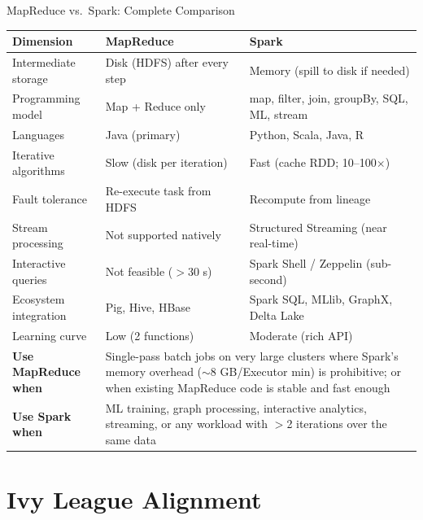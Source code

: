 \documentclass[aspectratio=169,10pt]{beamer}
\begin{document}
\begin{frame}{MapReduce vs.\ Spark: Complete Comparison}
  \centering
  \renewcommand{\arraystretch}{1.45}
  \begin{tabular}{p{2.8cm}p{3.2cm}p{3.8cm}}
    \toprule
    \textbf{Dimension} & \textbf{MapReduce} & \textbf{Spark} \\
    \midrule
    Intermediate storage  & Disk (HDFS) after every step & Memory (spill to disk if needed) \\
    Programming model     & Map + Reduce only & map, filter, join, groupBy, SQL, ML, stream \\
    Languages             & Java (primary)    & Python, Scala, Java, R \\
    Iterative algorithms  & Slow (disk per iteration) & Fast (cache RDD; 10--100$\times$) \\
    Fault tolerance       & Re-execute task from HDFS & Recompute from lineage \\
    Stream processing     & Not supported natively & Structured Streaming (near real-time) \\
    Interactive queries   & Not feasible ($>$30 s)    & Spark Shell / Zeppelin (sub-second) \\
    Ecosystem integration & Pig, Hive, HBase  & Spark SQL, MLlib, GraphX, Delta Lake \\
    Learning curve        & Low (2 functions) & Moderate (rich API) \\
    \midrule
    \textbf{Use MapReduce when} & \multicolumn{2}{p{7.0cm}}{\small Single-pass batch jobs on very large clusters where Spark's memory overhead ($\sim$8 GB/Executor min) is prohibitive; or when existing MapReduce code is stable and fast enough} \\
    \textbf{Use Spark when} & \multicolumn{2}{p{7.0cm}}{\small ML training, graph processing, interactive analytics, streaming, or any workload with $>$2 iterations over the same data} \\
    \bottomrule
  \end{tabular}
\end{frame}

\section{Ivy League Alignment}
\end{document}
